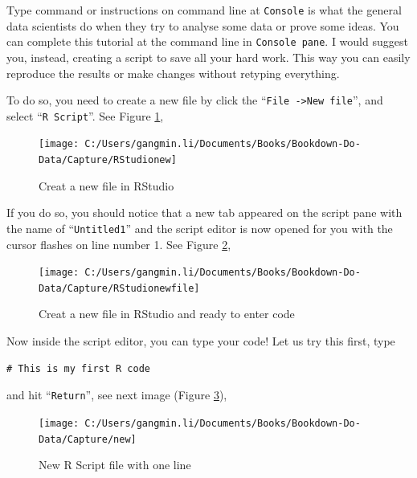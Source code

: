 \documentclass[
]{book}
\begin{document}
Type command or instructions on command line at \texttt{Console} is what the general data scientists do when they try to analyse some data or prove some ideas. You can complete this tutorial at the command line in \texttt{Console\ pane}. I would suggest you, instead, creating a script to save all your hard work. This way you can easily reproduce the results or make changes without retyping everything.

To do so, you need to create a new file by click the ``\texttt{File\ -\textgreater{}New\ file}'', and select ``\texttt{R\ Script}''. See Figure \ref{fig:newrfile},

\begin{figure}

{\centering \texttt{[image: C:/Users/gangmin.li/Documents/Books/Bookdown-Do-Data/Capture/RStudionew]} 

}

\caption{Creat a new file in RStudio}\label{fig:newrfile}
\end{figure}

If you do so, you should notice that a new tab appeared on the script pane with the name of ``\texttt{Untitled1}'' and the script editor is now opened for you with the cursor flashes on line number 1. See Figure \ref{fig:newrcfile},

\begin{figure}

{\centering \texttt{[image: C:/Users/gangmin.li/Documents/Books/Bookdown-Do-Data/Capture/RStudionewfile]} 

}

\caption{Creat a new file in RStudio and ready to enter code}\label{fig:newrcfile}
\end{figure}

Now inside the script editor, you can type your code! Let us try this first, type

\begin{verbatim}
# This is my first R code
\end{verbatim}

and hit ``\texttt{Return}'', see next image (Figure \ref{fig:newrcode}),

\begin{figure}

{\centering \texttt{[image: C:/Users/gangmin.li/Documents/Books/Bookdown-Do-Data/Capture/new]} 

}

\caption{New R Script file with one line}\label{fig:newrcode}
\end{figure}
\end{document}
